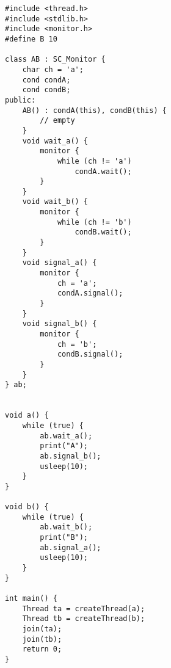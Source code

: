 \begin{lstlisting}
#include <thread.h>
#include <stdlib.h>
#include <monitor.h>
#define B 10

class AB : SC_Monitor {
    char ch = 'a';
    cond condA;
    cond condB;
public:
    AB() : condA(this), condB(this) {
        // empty
    }
    void wait_a() {
        monitor {
            while (ch != 'a')
                condA.wait();
        }
    }
    void wait_b() {
        monitor {
            while (ch != 'b')
                condB.wait();
        }
    }
    void signal_a() {
        monitor {
            ch = 'a';
            condA.signal();
        }
    }
    void signal_b() {
        monitor {
            ch = 'b';
            condB.signal();
        }
    }
} ab;


void a() {
    while (true) {
        ab.wait_a();
        print("A");
        ab.signal_b();
        usleep(10);
    }
}

void b() {
    while (true) {
        ab.wait_b();
        print("B");
        ab.signal_a();
        usleep(10);
    }
}

int main() {
    Thread ta = createThread(a);
    Thread tb = createThread(b);
    join(ta);
    join(tb);
    return 0;
}

\end{lstlisting}
